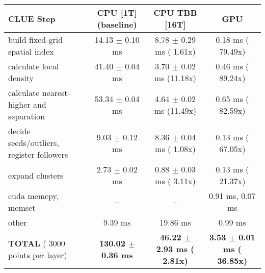     \begin{tabular}{l|c|c|c}
    \hline
    CLUE Step                                 & CPU [1T] (baseline)         & CPU TBB [16T]                         & GPU                       \\ \hline
    build fixed-grid spatial index            &  14.13 $\pm$  0.10 ms       &   8.78 $\pm$  0.29 ms ( 1.61x)        &   0.18 ms ( 79.49x)       \\
    calculate local density                   &  41.40 $\pm$  0.04 ms       &   3.70 $\pm$  0.02 ms (11.18x)        &   0.46 ms ( 89.24x)       \\
    calculate nearest-higher and separation   &  53.34 $\pm$  0.04 ms       &   4.64 $\pm$  0.02 ms (11.49x)        &   0.65 ms ( 82.59x)       \\
    decide seeds/outliers, register followers &   9.03 $\pm$  0.12 ms       &   8.36 $\pm$  0.04 ms ( 1.08x)        &   0.13 ms ( 67.05x)       \\
    expand clusters                           &   2.73 $\pm$  0.02 ms       &   0.88 $\pm$  0.03 ms ( 3.11x)        &   0.13 ms ( 21.37x)       \\ \hline
    cuda memcpy, memset                       & --                          & --                                    &   0.91 ms,   0.07 ms      \\ 
    other                                     &   9.39 ms                   &  19.86 ms                             &   0.99 ms                 \\ \hline
    \textbf{TOTAL} ( 3000 points per layer)   & \textbf{130.02 $\pm$  0.36 ms} & \textbf{ 46.22 $\pm$  2.93 ms ( 2.81x)} & \textbf{  3.53 $\pm$  0.01 ms ( 36.85x)}  \\
    \hline 
    \end{tabular}
    \linebreak


